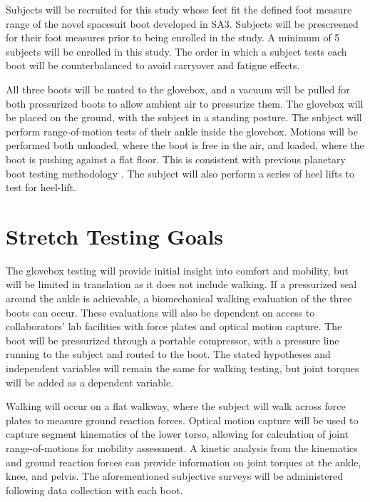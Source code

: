 \documentclass[defaultstyle,11pt]{comps}
\begin{document}
Subjects will be recruited for this study whose feet fit the defined foot measure range of the novel spacesuit boot developed in SA3.
Subjects will be prescreened for their foot measures prior to being enrolled in the study.
A minimum of 5 subjects will be enrolled in this study.
The order in which a subject tests each boot will be counterbalanced to avoid carryover and fatigue effects.

All three boots will be mated to the glovebox, and a vacuum will be pulled for both pressurized boots to allow ambient air to pressurize them.
The glovebox will be placed on the ground, with the subject in a standing posture.
The subject will perform range-of-motion tests of their ankle inside the glovebox.
Motions will be performed both unloaded, where the boot is free in the air, and loaded, where the boot is pushing against a flat floor.
This is consistent with previous planetary boot testing methodology \citep{Ross2002}.
The subject will also perform a series of heel lifts to test for heel-lift.

\hypertarget{stretch-testing-goals}{%
\section{Stretch Testing Goals}\label{stretch-testing-goals}}

The glovebox testing will provide initial insight into comfort and mobility, but will be limited in translation as it does not include walking.
If a pressurized seal around the ankle is achievable, a biomechanical walking evaluation of the three boots can occur.
These evaluations will also be dependent on access to collaborators' lab facilities with force plates and optical motion capture.
The boot will be pressurized through a portable compressor, with a pressure line running to the subject and routed to the boot.
The stated hypotheses and independent variables will remain the same for walking testing, but joint torques will be added as a dependent variable.

Walking will occur on a flat walkway, where the subject will walk across force plates to measure ground reaction forces.
Optical motion capture will be used to capture segment kinematics of the lower torso, allowing for calculation of joint range-of-motions for mobility assessment.
A kinetic analysis from the kinematics and ground reaction forces can provide information on joint torques at the ankle, knee, and pelvis.
The aforementioned subjective surveys will be administered following data collection with each boot.
\end{document}

